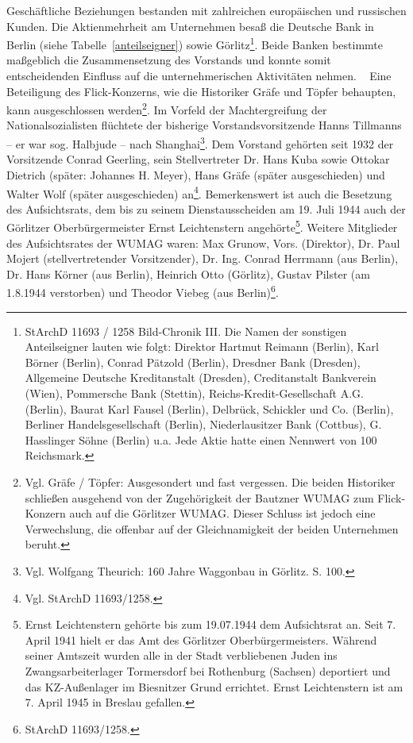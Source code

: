 Geschäftliche Beziehungen bestanden mit zahlreichen europäischen und russischen Kunden. Die Aktienmehrheit am Unternehmen besaß die Deutsche Bank in Berlin (siehe Tabelle~\ref{anteilseigner}) sowie Görlitz\footnote{StArchD 11693 / 1258 Bild-Chronik III. Die Namen der sonstigen Anteilseigner lauten wie folgt: Direktor Hartmut Reimann (Berlin), Karl Börner (Berlin), Conrad Pätzold (Berlin), Dresdner Bank (Dresden), Allgemeine Deutsche Kreditanstalt (Dresden), Creditanstalt Bankverein (Wien), Pommersche Bank (Stettin), Reichs-Kredit-Gesellschaft A.G. (Berlin), Baurat Karl Fausel (Berlin), Delbrück, Schickler und Co. (Berlin), Berliner Handelsgesellschaft (Berlin), Niederlausitzer Bank (Cottbus), G. Hasslinger Söhne (Berlin) u.a. Jede Aktie hatte einen Nennwert von 100 Reichsmark.}. Beide Banken bestimmte maßgeblich die Zusammensetzung des Vorstands und konnte somit entscheidenden Einfluss auf die unternehmerischen Aktivitäten nehmen.
~\newline
Eine Beteiligung des Flick-Konzerns, wie die Historiker Gräfe und Töpfer behaupten, kann ausgeschlossen werden\footnote{Vgl. Gräfe / Töpfer: Ausgesondert und fast vergessen. Die beiden Historiker schließen ausgehend von der Zugehörigkeit der Bautzner WUMAG zum Flick-Konzern auch auf die Görlitzer WUMAG. Dieser Schluss ist jedoch eine Verwechslung, die offenbar auf der Gleichnamigkeit der beiden Unternehmen beruht.}. Im Vorfeld der Machtergreifung der Nationalsozialisten flüchtete der bisherige Vorstandsvorsitzende Hanns Tillmanns -- er war sog. Halbjude -- nach Shanghai\footnote{Vgl. Wolfgang Theurich: 160 Jahre Waggonbau in Görlitz. S. 100.}. Dem Vorstand gehörten seit 1932 der Vorsitzende Conrad  Geerling, sein Stellvertreter Dr. Hans Kuba sowie Ottokar Dietrich (später: Johannes H. Meyer), Hans Gräfe (später ausgeschieden) und Walter Wolf (später ausgeschieden) an\footnote{Vgl. StArchD 11693/1258.}. Bemerkenswert ist auch die Besetzung des Aufsichtsrats, dem bis zu seinem Dienstausscheiden am 19. Juli 1944 auch der Görlitzer Oberbürgermeister Ernst Leichtenstern angehörte\footnote{Ernst Leichtenstern gehörte bis zum 19.07.1944 dem Aufsichtsrat an. Seit 7. April 1941 hielt er das Amt des Görlitzer Oberbürgermeisters. Während seiner Amtszeit wurden alle in der Stadt verbliebenen Juden ins Zwangsarbeiterlager Tormersdorf bei Rothenburg (Sachsen) deportiert und das KZ-Außenlager im Biesnitzer Grund errichtet. Ernst Leichtenstern ist am 7. April 1945 in Breslau gefallen.}. Weitere Mitglieder des Aufsichtsrates der WUMAG waren: Max Grunow, Vors. (Direktor), Dr. Paul Mojert (stellvertretender Vorsitzender), Dr. Ing. Conrad Herrmann (aus Berlin), Dr. Hans Körner (aus Berlin), Heinrich Otto (Görlitz), Gustav Pilster (am 1.8.1944 verstorben) und Theodor Viebeg (aus Berlin)\footnote{StArchD 11693/1258.}.
